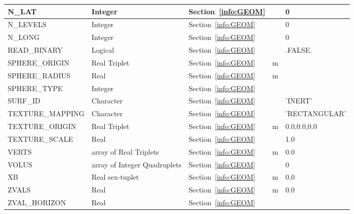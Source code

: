 \documentclass[12pt]{article}
\begin{document}
\begin{longtable}{@{\extracolsep{\fill}}|l|l|l|l|l|}
{\ct N\_LAT}       & Integer                & Section~\ref{info:GEOM}            &           &   0                      \\ \hline
{\ct N\_LEVELS}    & Integer                & Section~\ref{info:GEOM}            &           &   0                      \\ \hline
{\ct N\_LONG}      & Integer                & Section~\ref{info:GEOM}            &           &   0                      \\ \hline
{\ct READ\_BINARY}   & Logical         & Section~\ref{info:GEOM}            &              &   {\ct .FALSE.} \\ \hline
{\ct SPHERE\_ORIGIN}& Real Triplet          & Section~\ref{info:GEOM}            &   m       &             \\ \hline
{\ct SPHERE\_RADIUS}& Real                  & Section~\ref{info:GEOM}            &   m       &                    \\ \hline
{\ct SPHERE\_TYPE} & Integer                & Section~\ref{info:GEOM}            &           &                        \\ \hline
{\ct SURF\_ID}     & Character              & Section~\ref{info:GEOM}            &           &  {\ct 'INERT'}           \\ \hline
{\ct TEXTURE\_MAPPING}& Character           & Section~\ref{info:GEOM}            &           & {\ct 'RECTANGULAR'}      \\ \hline
{\ct TEXTURE\_ORIGIN} & Real Triplet        & Section~\ref{info:GEOM}            &   m       &   0.0,0.0,0.0            \\ \hline
{\ct TEXTURE\_SCALE}& Real                  & Section~\ref{info:GEOM}            &           &   1.0                    \\ \hline
{\ct VERTS}        & array of Real Triplets & Section~\ref{info:GEOM}            &   m       &   0.0                    \\ \hline
{\ct VOLUS}        & array of Integer Quadruplets     & Section~\ref{info:GEOM}  &           &    0                     \\ \hline
{\ct XB}           & Real sex-tuplet        & Section~\ref{info:GEOM}            &   m       &   0.0                    \\ \hline
{\ct ZVALS}        & Real                   & Section~\ref{info:GEOM}            &   m     &   0.0                    \\ \hline
{\ct ZVAL\_HORIZON}        & Real                   & Section~\ref{info:GEOM}    &      &                    \\ \hline



\end{longtable}
\end{document}
